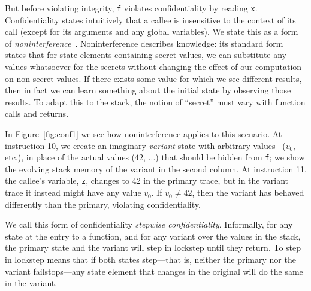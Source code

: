 \documentclass[10pt,conference]{ieeetran}%
\theoremstyle{definition}
\begin{document}
But before violating integrity, {\tt f} violates confidentiality by
reading {\tt x}.
Confidentiality states intuitively that a callee is insensitive to
the context of its call (except for its arguments and any global
variables).
We state this as a form of {\em noninterference}~\cite{Goguen1982SecurityPA}.
Noninterference describes knowledge: its standard form states that for state elements
containing secret values, we can substitute any values whatsoever for the secrets
without changing the effect of our computation on non-secret values.
If there exists some value for which we see different results, then
in fact we can learn something about the initial state by observing those results.
To adapt this to the stack, the notion of ``secret'' must vary with function
calls and returns.

In Figure~\ref{fig:conf1} we see how noninterference applies to this scenario.
At instruction 10, we
create an imaginary {\em variant}
state with arbitrary values~%
(\(v_0\), etc.),
in place of the actual values ($42$, ...) that should
be hidden from {\tt f}; we show the evolving stack memory of the variant in the second column.
At instruction 11, the callee's variable, {\tt z},
changes to 42 in the primary trace, but
in the variant trace it instead might have any value \(v_0\). If \(v_0 \neq 42\), then the variant
has behaved differently than the primary, violating confidentiality.

We call this form of confidentiality {\em stepwise confidentiality}. Informally,
for any state at the entry to a function, and for any variant over the values in the stack,
the primary state and the variant will step in lockstep until they
return. To step in lockstep
means that if both states step---that is, neither the primary nor the variant failstops---any
state element that changes in the original will do the same in the variant.
\end{document}
